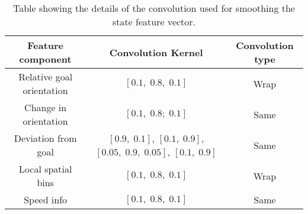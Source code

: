 \begin{table}
	\caption{Table showing the details of the convolution used for smoothing the state feature vector.}
	\label{conv-table}
	\begin{center}
		\renewcommand{\arraystretch}{1.3}
		\begin{tabular}{|c|c|c|}
			\hline
			Feature component & Convolution Kernel & Convolution type\\
			\hline
			Relative goal orientation & $ [0.1, \;0.8, \; 0.1 ]$ & Wrap  \\
			
			Change in orientation & $[ 0.1, \; 0.8; \;0.1 ]$ & Same \\
			
			Deviation from goal & $[0.9,\; 0.1]$, $[0.1,\; 0.9]$,
									      $[0.05, \; 0.9, \; 0.05]$, $[0.1,\; 0.9]$ & Same \\
			Local spatial bins & $[ 0.1, \; 0.8,\;0.1 ]$ & Wrap \\
			Speed info & $[ 0.1, \; 0.8,\;0.1 ]$  & Same \\
			\hline
		\end{tabular}
	\end{center}
\end{table}
